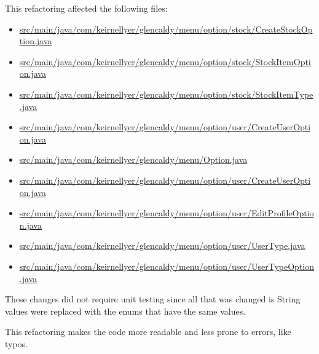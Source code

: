 \documentclass{article}
\begin{document}
This refactoring affected the following files:

\begin{itemize}
  \item \href{https://github.com/awave1/assessment-loan-system/commit/8a898a0#diff-c49bd7b5a03092704bbc30ad81eba452}{src/main/java/com/keirnellyer/glencaldy/menu/option/stock/CreateStockOption.java}
  \item \href{https://github.com/awave1/assessment-loan-system/commit/8a898a0#diff-43064b086900b084b9ba9a0a21259f52}{src/main/java/com/keirnellyer/glencaldy/menu/option/stock/StockItemOption.java}
  \item \href{https://github.com/awave1/assessment-loan-system/commit/8a898a0#diff-66b4305ce658fffb57183aa2cb087b45}{src/main/java/com/keirnellyer/glencaldy/menu/option/stock/StockItemType.java}
  \item \href{https://github.com/awave1/assessment-loan-system/commit/8a898a0#diff-324214305313e033e9b728b876641bfb}{src/main/java/com/keirnellyer/glencaldy/menu/option/user/CreateUserOption.java}
  \item \href{https://github.com/awave1/assessment-loan-system/commit/b6b0c98#diff-6012c42428b9d544f30f47675319c34f}{src/main/java/com/keirnellyer/glencaldy/menu/Option.java}
  \item \href{https://github.com/awave1/assessment-loan-system/commit/b6b0c98#diff-324214305313e033e9b728b876641bfb}{src/main/java/com/keirnellyer/glencaldy/menu/option/user/CreateUserOption.java}
  \item \href{https://github.com/awave1/assessment-loan-system/commit/b6b0c98#diff-f1c921e04cdb1c5e682f11c12373172d}{src/main/java/com/keirnellyer/glencaldy/menu/option/user/EditProfileOption.java}
  \item \href{https://github.com/awave1/assessment-loan-system/commit/b6b0c98#diff-ac72844ef827260c5f789584a63989ee}{src/main/java/com/keirnellyer/glencaldy/menu/option/user/UserType.java}
  \item \href{https://github.com/awave1/assessment-loan-system/commit/b6b0c98#diff-65cc8c98018c43e208a180c9e71ff560}{src/main/java/com/keirnellyer/glencaldy/menu/option/user/UserTypeOption.java}
\end{itemize}

These changes did not require unit testing since all that was changed is String values were replaced with the enums that have the same values.

This refactoring makes the code more readable and less prone to errors, like typos.
\end{document}
